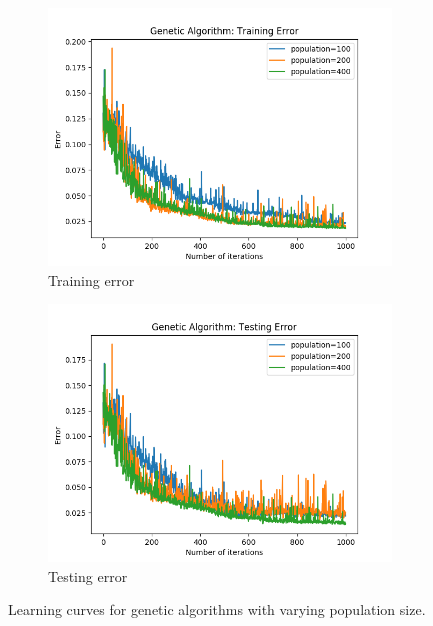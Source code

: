 \documentclass{article}
\begin{document}
        \begin{figure}[htb]
        \centering

        \begin{subfigure}{0.5\textwidth}
          \includegraphics[width=\linewidth]{out/ga/population-training.png}
          \caption{Training error}
          \label{fig:ga-population-1}
        \end{subfigure}\hfil
        \begin{subfigure}{0.5\textwidth}
          \includegraphics[width=\linewidth]{out/ga/population-testing.png}
          \caption{Testing error}
          \label{fig:ga-population-2}
        \end{subfigure}

        \caption{Learning curves for genetic algorithms with varying population size.}
        \label{fig:ga-population}
        \end{figure}
\end{document}
